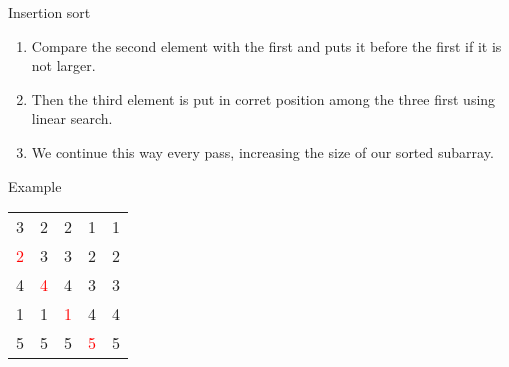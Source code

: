 \documentclass[a4paper]{article}
\begin{document}
\begin{parag}{Insertion sort}
    \begin{enumerate}[left=0pt]
        \item Compare the second element with the first and puts it before the first if it is not larger.
        \item Then the third element is put in corret position among the three first using linear search.
        \item We continue this way every pass, increasing the size of our sorted subarray.
    \end{enumerate}

    
\end{parag}

\begin{parag}{Example}
    \begin{tabular}{ccccc}
        3 & 2 & 2 & 1 & \textcolor{maincolour}{1}\\
        \textcolor{red}{2} & 3 & 3 & 2 & \textcolor{maincolour}{2}\\
        4 & \textcolor{red}{4} & 4 & 3 & \textcolor{maincolour}{3}\\
        1 & 1 & \textcolor{red}{1} & 4 & \textcolor{maincolour}{4}\\
        5 & 5 & 5 & \textcolor{red}{5} & \textcolor{maincolour}{5}
    \end{tabular}

\end{parag}
\end{document}

